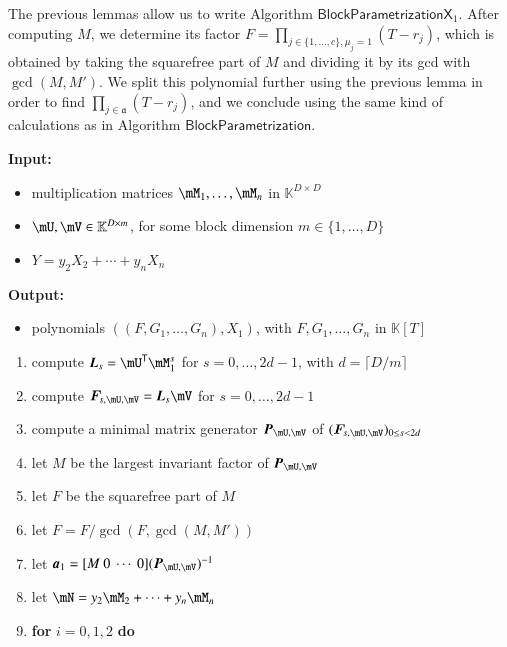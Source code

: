 \documentclass[final,1p,times,authoryear]{elsarticle}
\newcommand{\mat}[1]{\bm{\MakeUppercase{#1}}} %
\newcommand{\row}[1]{\bm{\MakeLowercase{#1}}} %
\newcommand{\seqelt}[1]{\bm{F}_{#1}} %
\newcommand{\mainalgoname}{\mathsf{ BlockParametrization}}
\newcommand{\mf}{Y}
\newcommand{\trsp}[1]{#1^{\mathsf{T}}} %
\def\K{\mathbb{K}}
\def\K {\ensuremath{\mathbb{K}}}
\newcommand{\mUt}{\trsp{\mU}}
\begin{document}
The previous lemmas allow us to write Algorithm
$\mathsf{BlockParametrizationX}_1$. After computing $M$, we determine its
factor $F=\prod_{j \in \{1,\dots,c\}, \mu_j=1} (T-r_j)$, which is
obtained by taking the squarefree part of $M$ and dividing it by
its gcd with $\gcd(M,M')$. We split this polynomial further using the previous
lemma in order to find $\prod_{j \in \mathfrak{a}} (T-r_j)$, and we
conclude using the same kind of calculations as in Algorithm
$\mainalgoname$.

\begin{algorithm}[H]
  \caption{$\mainalgoname{\sf X}_1(\mM_1,\dots,\mM_n,\mU,\mV,\mf$)}
  {\bf Input:} \vspace{-0.5em}
  \begin{itemize}
    \item multiplication matrices $\mM_1,\dots,\mM_n$ in $\K^{D \times D}$
    \item  $\mU,\mV \in \mathbb{K}^{D \times m}$, for some block dimension  $m \in \{1,\dots,D\}$
    \item $\mf =y_2 X_2 + \cdots + y_n X_n$
  \end{itemize}
  {\bf Output:}  \vspace{-0.5em}
  \begin{itemize}
    \item polynomials $((F,G_1,\dots,G_n),X_1)$, with $F,G_1,\dots,G_n$ in $\K[T]$
  \end{itemize}
  \begin{enumerate}
    \item\label{X1step3} { compute $\mat{L}_s = \mUt\mM_1^s$ for $s=0,\dots,2d-1$, with $d = \lceil D/m \rceil$}
    \item\label{X1step4} { compute $\seqelt{s,\mU,\mV}= \mat{L}_s\mV$ for $s=0,\dots, 2d-1$}
    \item\label{X1step5} { compute a minimal matrix generator $\mat{P}_{\mU,\mV}$ of $(\seqelt{s,\mU,\mV})_{0 \le s < 2d}$}
    \item\label{X1step6} { let $M$ be the largest invariant factor of $\mat{P}_{\mU,\mV}$}
    \item\label{X1step7} { let $F$ be  the squarefree part  of $M$}
    \item\label{X1step7b} let $F = F /\gcd(F, \gcd (M, M'))$
    \item\label{X1step8} { let $\row{a}_1 = [M~0 ~\cdots~ 0] (\mat{P}_{\mU,\mV})^{-1}$}
    \item let $\mN = y_2 \mM_2 + \cdots+y_n \mM_n$
    \item \textbf{for} $i=0,1,2$ \textbf{do} \\

\end{enumerate}
\end{algorithm}
\end{document}
